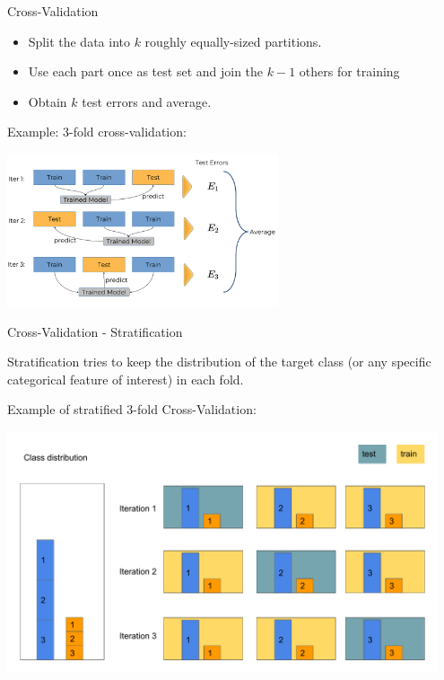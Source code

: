 \documentclass[11pt,compress,t,notes=noshow, xcolor=table]{beamer}
\newenvironment{knitrout}{}{} %
\begin{document}
\begin{vbframe}{Cross-Validation}

\begin{itemize}
  \item Split the data into $k$ roughly equally-sized partitions.
  \item Use each part once as test set and join the $k-1$ others for training
  \item Obtain $k$ test errors and average.
\end{itemize}

\lz

Example: 3-fold cross-validation:

\begin{center}
\includegraphics[width=8cm]{figure_man/crossvalidation.png}
\end{center}
\end{vbframe}

\begin{vbframe}{Cross-Validation - Stratification}

Stratification tries to keep the distribution of the target class (or any specific categorical feature of interest) in each fold.

\lz

Example of stratified 3-fold Cross-Validation:

\lz

\begin{knitrout}\scriptsize
{}\color{fgcolor}

{\centering \includegraphics[width=0.95\textwidth]{figure/eval_resample_1} 

}



\end{knitrout}
\end{vbframe}
\end{document}
